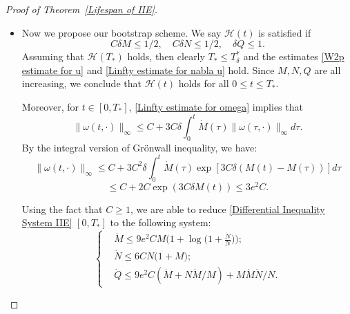 \documentclass[12pt,letterpaper]{article}
\theoremstyle{plain}
\begin{document}
\begin{proof}[Proof of Theorem~\ref{Lifespan of IIE}]
\begin{itemize}
\begin{equation}
\right.    
\end{equation}
Moreover, as long as $C\delta M(t)<1$, we have the following estimate for $\lVert\omega\rVert_\infty$:
\begin{equation*}
 \lVert\omega(t,\cdot)\rVert_\infty \le \lVert\omega_0\rVert_\infty+\lVert\nabla \rho_0\rVert_\infty\int_0^t \lVert\nabla^*X\rVert_\infty \lVert\nabla u\rVert_\infty \lVert u\rVert_\infty d\tau  
\end{equation*}
\begin{equation}\label{Linfty estimate for omega}
 \le   C+C\delta \int_0^t \frac{(1+\delta M)\dot M}{1-C\delta M}\lVert\omega\rVert_\infty d\tau.
\end{equation}

\item [(II)]

Now we propose our bootstrap scheme. We say $\mathscr H(t)$ is satisfied if
\begin{equation}\label{Hypothesis IIE}
 C\delta M\le 1/2,\quad C\delta N\le 1/2  ,\quad \delta Q\le 1.
\end{equation}
Assuming that $\mathscr H(T_*)$ holds, then clearly $T_*\le T_\delta^*$ and the estimates \eqref{W2p estimate for u} and \eqref{Linfty estimate for nabla u} hold. Since $M,N,Q$ are all increasing, we conclude that $\mathscr H(t)$ holds for all $0\le t\le T_*$. 

Moreover, for $t\in [0,T_*]$, \eqref{Linfty estimate for omega} implies that
\begin{equation*}
\lVert\omega(t,\cdot)\rVert_\infty\le   C+3C\delta \int_0^t {\dot M(\tau)\lVert\omega(\tau,\cdot)\rVert_\infty} d\tau.  
\end{equation*}
By the integral version of Gr\"onwall inequality, we have:
\begin{equation*}
 \lVert\omega(t,\cdot)\rVert_\infty\le  C+3C^2\delta\int_0^t \dot M(\tau)\exp[3C\delta(M(t)-M(\tau))]d\tau
\end{equation*}
\begin{equation*}
 \le C+2C\exp(3C\delta M(t))\le 3e^2 C .   
\end{equation*}

Using the fact that $C\ge 1$, we are able to reduce \eqref{Differential Inequality System IIE} $[0,T_*]$ to the following system:
\begin{equation}\label{Relaxed Differential Inequality System IIE}
\left\{
\begin{aligned}
&{\dot M}\le  9e^2CM\Big(1+\log\Big(1+\frac{\dot N}{N}\Big)\Big);\\
&\dot N\le 6CN\big(1+M);  \\
&\dot Q\le 9e^2C(\dot M+N\dot M/M)+M\dot M\dot N/N.
\end{aligned}
\right.    
\end{equation}


\end{itemize}
\end{proof}
\end{document}

